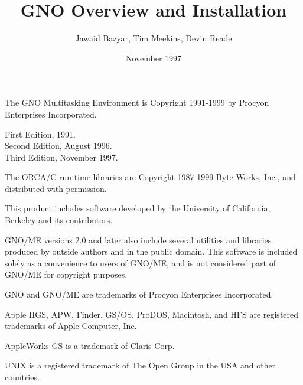 \documentclass{report}
\begin{document}
\title{GNO Overview and Installation}
\author{Jawaid Bazyar, Tim Meekins, Devin Reade}
\date{November 1997}
\maketitle


\nocite{*}

%
%
\newcommand{\faqhtml}[1]{\htlink{#1}
	{http://www.gno.org/~gno/FAQ.html}}
\newcommand{\faqtext}[1]{\htlink{#1}
	{ftp://ftp.gno.org/pub/apple2/gs.specific/gno/doc/faq/CURRENT}}
\newcommand{\gnodocs}[1]{\htlink{#1}
	{http://www.gno.org/~gno}}
\newcommand{\delphi}[1]{\htlink{#1}
	{http://delphi.com}}
\newcommand{\overview}[1]{\htlink{#1}
	{http://www.gno.org/~gno/intro.html}}
\newcommand{\kernel}[1]{\htlink{#1}
	{http://www.gno.org/~gno/kern.html}}
\newcommand{\gsh}[1]{\htlink{#1}
	{http://www.gno.org/~gno/gsh/index.html}}
\newcommand{\manpages}[1]{\htlink{#1}
	{http://www.gno.org/~gno/manindex.html}}
\parindent=0pt
\parskip=1pc

The GNO Multitasking Environment is Copyright 1991-1999 by
Procyon Enterprises Incorporated.

\begin{flushleft}
First Edition, 1991. \\
Second Edition, August 1996. \\
Third Edition, November 1997.
\end{flushleft}

The ORCA/C run-time libraries are Copyright 1987-1999 Byte Works, Inc.,
and distributed with permission.

This product includes software developed by the University of California,
Berkeley and its contributors.

GNO/ME versions 2.0 and later also include several utilities and
libraries produced by
outside authors and in the public domain. This software is included
solely as a convenience to users of GNO/ME, and is not considered part
of GNO/ME for copyright purposes.

GNO and GNO/ME are trademarks of Procyon Enterprises Incorporated.

Apple IIGS, APW, Finder, GS/OS, ProDOS, Macintosh, and HFS are registered
trademarks of Apple Computer, Inc.

AppleWorks GS is a trademark of Claris Corp.

UNIX is a registered trademark of The Open Group in the USA and other
countries.
\end{document}
